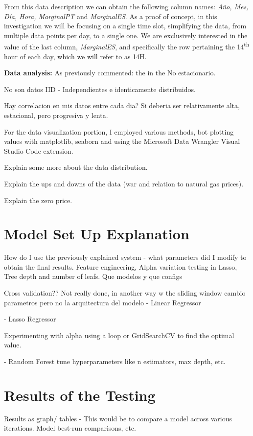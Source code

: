 \documentclass[12pt]{report} %
\begin{document}
From this data description we can obtain the following column names: \textit{Año, Mes, Día, Hora, MarginalPT} and \textit{MarginalES}. As a proof of concept, in this investigation we will be focusing on a single time slot, simplifying the data, from multiple data points per day, to a single one. We are exclusively interested in the value of the last column, \textit{MarginalES}, and specifically the row pertaining the 14\textsuperscript{th} hour of each day, which we will refer to as 14H.

\noindent \textbf{Data analysis:}
As previously commented: the in the
No estacionario.

No son datos IID - Independientes e identicamente distribuidos.

Hay correlacion en mis datos entre cada dia? Si deberia ser relativamente alta, estacional, pero progresiva y lenta.

For the data visualization portion, I employed various methods, bot plotting values with matplotlib, seaborn and using the Microsoft Data Wrangler Visual Studio Code extension.

Explain some more about the data distribution.

Explain the ups and downs of the data (war and relation to natural gas prices).

Explain the zero price.

\section{Model Set Up Explanation}
How do I use the previously explained system - what parameters did I modify to obtain the final results. Feature engineering, Alpha variation testing in Lasso, Tree depth and number of leafs.
Que modelos y que configs

Cross validation?? Not really done, in another way w the sliding window
cambio parametros pero no la arquitectura del modelo
- Linear Regressor

- Lasso Regressor

Experimenting with alpha using a loop or GridSearchCV to find the optimal value.

- Random Forest
tune hyperparameters like n estimators, max depth, etc.

\section{Results of the Testing}
Results as graph/ tables - This would be to compare a model across various iterations. Model best-run comparisons, etc.
\end{document}
